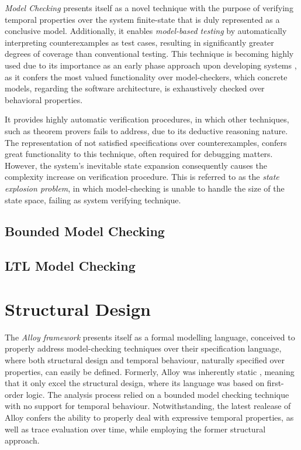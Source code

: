 \textit{Model Checking} presents itself as a novel technique with the purpose of verifying temporal properties over the system finite-state that is duly represented as a conclusive model. Additionally, it enables \textit{model-based testing} by automatically interpreting counterexamples as test cases, resulting in significantly greater degrees of coverage than conventional testing. \cite{fraser2009testing, beyer2017software} This technique is becoming highly used due to its importance as an early phase approach upon developing systems \cite{lwspecification}, as it confers the most valued functionality over model-checkers, which concrete models, regarding the software architecture, is exhaustively checked over behavioral properties. 

It provides highly automatic verification procedures, in which other techniques, such as theorem provers fails to address, due to its deductive reasoning nature. The representation of not satisfied specifications over counterexamples, confers great functionality to this technique, often required for debugging matters.
However, the system's inevitable state expansion consequently causes the complexity increase on verification procedure. This is referred to as the \textit{state explosion problem}, in which model-checking is unable to handle the size of the state space, failing as system verifying technique. \cite{clarke2011model, clarke1997model} 

\subsection{Bounded Model Checking}

\subsection{LTL Model Checking}

\section{Structural Design}

The \textit{Alloy framework} presents itself as a formal modelling language, conceived to properly address model-checking techniques over their specification language, where both structural design and temporal behaviour, naturally specified over properties, can easily be defined. Formerly, Alloy was inherently static \cite{lwspecification}, meaning that it only excel the structural design, where its language was based on first-order logic. The analysis process relied on a bounded model checking technique with no support for temporal behaviour. Notwithstanding, the latest realease of Alloy confers the ability to properly deal with expressive temporal properties, as well as trace evaluation over time, while employing the former structural approach. 

